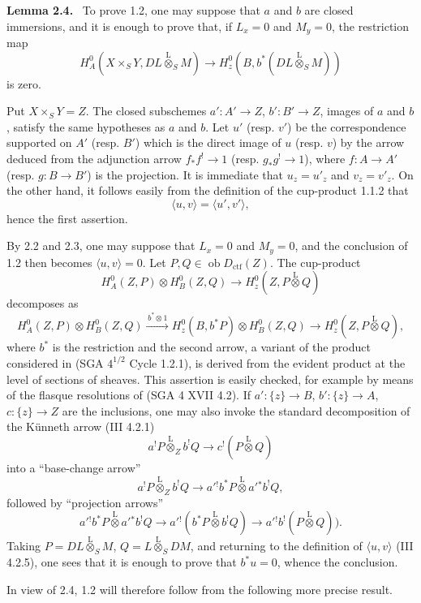 \documentclass[11pt]{article}
\newenvironment{statement}[1]{\par\medskip\noindent\textbf{#1.}\ }{\par\medskip}
\providecommand{\lten}{\overset{\mathrm L}{\otimes}}
\providecommand{\Ob}{\operatorname{ob}}
\providecommand{\lten}{\overset{\mathrm L}{\otimes}}
\providecommand{\lten}{\overset{\mathrm L}{\otimes}}
\providecommand{\Ob}{\operatorname{ob}}
\providecommand{\lten}{\overset{\mathrm L}{\otimes}}
\providecommand{\lten}{\overset{\mathrm L}{\otimes}}
\providecommand{\Ob}{\operatorname{Ob}}
\providecommand{\lten}{\overset{\mathrm L}{\otimes}}
\providecommand{\Ob}{\operatorname{ob}}
\providecommand{\Ob}{\operatorname{Ob}}
\providecommand{\lten}{\overset{\mathrm L}{\otimes}}
\begin{document}
\begin{statement}{Lemma 2.4}
To prove 1.2, one may suppose that $a$ and $b$ are closed immersions, and it is enough to prove that, if $L_x=0$ and $M_y=0$, the restriction map
\begin{equation}
H_A^0(X\times_SY,DL\lten_SM)
 \longrightarrow H_z^0(B,b^*(DL\lten_SM))
\tag{2.4.1}
\end{equation}
is zero.
\end{statement}

Put $X\times_SY=Z$. The closed subschemes $a':A'\to Z$, $b':B'\to Z$, images of $a$ and $b$, satisfy the same hypotheses as $a$ and $b$. Let $u'$ (resp. $v'$) be the correspondence supported on $A'$ (resp. $B'$) which is the direct image of $u$ (resp. $v$) by the arrow deduced from the adjunction arrow $f_*f^!\to1$ (resp. $g_*g^!\to1$), where $f:A\to A'$ (resp. $g:B\to B'$) is the projection. It is immediate that $u_z=u'_z$ and $v_z=v'_z$. On the other hand, it follows easily from the definition of the cup-product 1.1.2 that
\[
\langle u,v\rangle=\langle u',v'\rangle,
\]
hence the first assertion.

By 2.2 and 2.3, one may suppose that $L_x=0$ and $M_y=0$, and the conclusion of 1.2 then becomes $\langle u,v\rangle=0$. Let $P,Q\in\Ob D_{\mathrm{ctf}}(Z)$. The cup-product
\[
H_A^0(Z,P)\otimes H_B^0(Z,Q)\longrightarrow H_z^0(Z,P\lten Q)
\]
decomposes as
\[
H_A^0(Z,P)\otimes H_B^0(Z,Q)
 \xrightarrow{\,b^*\otimes 1\,}
H_z^0(B,b^*P)\otimes H_B^0(Z,Q)
 \longrightarrow H_z^0(Z,P\lten Q),
\]
where $b^*$ is the restriction and the second arrow, a variant of the product considered in (SGA $4^{1/2}$ Cycle 1.2.1), is derived from the evident product at the level of sections of sheaves. This assertion is easily checked, for example by means of the flasque resolutions of (SGA 4 XVII 4.2). If $a':\{z\}\to B$, $b':\{z\}\to A$, $c:\{z\}\to Z$ are the inclusions, one may also invoke the standard decomposition of the Künneth arrow (III 4.2.1)
\[
a^!P\lten_Z b^!Q\longrightarrow c^!(P\lten Q)
\]
into a ``base-change arrow''
\[
a^!P\lten_Z b^!Q\longrightarrow a'{}^!b^*P\lten a'{}^*b^!Q,
\]
followed by ``projection arrows''
\[
a'{}^!b^*P\lten a'{}^*b^!Q
 \longrightarrow a'{}^!(b^*P\lten b^!Q)
 \longrightarrow a'{}^!b^!(P\lten Q)).
\]
Taking $P=DL\lten_SM$, $Q=L\lten_SDM$, and returning to the definition of $\langle u,v\rangle$ (III 4.2.5), one sees that it is enough to prove that $b^*u=0$, whence the conclusion.

In view of 2.4, 1.2 will therefore follow from the following more precise result.
\end{document}

